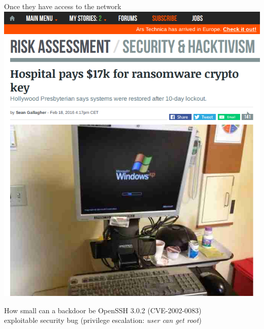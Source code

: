\documentclass[11pt]{beamer}
\begin{document}
\begin{frame}{Once they have access to the network}
\includegraphics[scale=0.28]{ransomware.png}
\end{frame}

\begin{frame}{How small can a backdoor be}
OpenSSH 3.0.2 (CVE-2002-0083)\\
exploitable security bug (privilege escalation: \emph{user can get root}) 

\end{frame}
\end{document}

